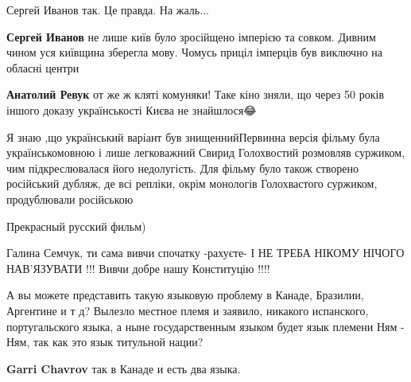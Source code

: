 \begin{itemize}
\begin{itemize}
Сергей Иванов так. Це правда. На жаль...


\textbf{Сергей Иванов} не лише київ було зросійщено імперією та совком. Дивним
чином уся київщина зберегла мову. Чомусь приціл імперців був виключно на
обласні центри

\textbf{Анатолий Ревук} от же ж кляті комуняки! Таке кіно зняли, що через 50
років іншого доказу українськості Києва не знайшлося😂


Я знаю ,що український варіант був знищеннийПервинна версія фільму була
українськомовною і лише легковажний Свирид Голохвостий розмовляв суржиком, чим
підкреслювалася його недолугість. Для фільму було також створено російський
дубляж, де всі репліки, окрім монологів Голохвастого суржиком, продублювали
російською



Прекрасный русский фильм)

\end{itemize}


Галина Семчук, ти сама вивчи спочатку -рахуєте- І НЕ ТРЕБА НІКОМУ НІЧОГО
НАВ'ЯЗУВАТИ !!! Вивчи добре нашу Конституцію !!!!



А вы можете представить такую языковую проблему в Канаде, Бразилии, Аргентине и
т д? Вылезло местное племя и заявило, никакого испанского, португальского
языка, а ныне государственным языком будет язык племени Ням - Ням, так как это
язык титульной нации?

\begin{itemize}
\textbf{Garri Chavrov} так в Канаде и есть два языка.


\end{itemize}
\end{itemize}
